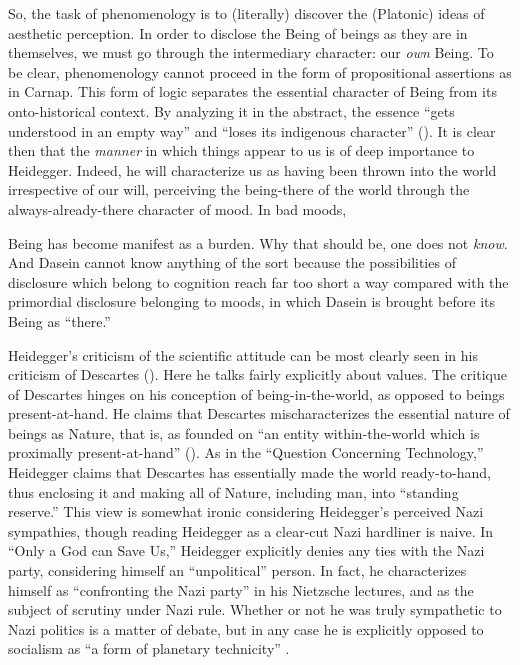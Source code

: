 \documentclass[leqno, 12pt]{turabian-researchpaper}
\begin{document}
	So, the task of phenomenology is to (literally) discover the (Platonic) ideas of
	aesthetic perception. In order to disclose the Being of beings as they are in
	themselves, we must go through the intermediary character: our \textit{own} Being.
	To be clear, phenomenology cannot proceed in the form of propositional assertions
	as in Carnap. This form of logic separates the essential character of Being
	from its onto-historical context. By analyzing it in the abstract, the essence
	\enquote{gets understood in an empty way} and \enquote{loses its indigenous character}
	(). It is clear then that the \textit{manner} in
	which things appear to us is of deep importance to Heidegger. Indeed, he will
	characterize us as having been thrown into the world irrespective of our will,
	perceiving the being-there of the world through the always-already-there character
	of mood. In bad moods,
	\begin{displayquote}
		 Being has become manifest as a burden.
		Why that should be, one does not \emph{know}. And Dasein cannot know anything
		of the sort because the possibilities of disclosure which belong to cognition
		reach far too short a way compared with the primordial disclosure belonging to
		moods, in which Dasein is brought before its Being as \enquote{there.}
	\end{displayquote}

	Heidegger's criticism of the scientific attitude can be most clearly seen in
	his criticism of Descartes (). Here
	he talks fairly explicitly about values. The critique of Descartes hinges on
	his conception of being-in-the-world, as opposed to beings present-at-hand. He
	claims that Descartes mischaracterizes the essential nature of beings as
	Nature, that is, as founded on \enquote{an entity within-the-world which is proximally present-at-hand}
	(). As in the \enquote{Question Concerning Technology,}
	\nocite{heidegger2008c} Heidegger claims that Descartes has essentially made
	the world ready-to-hand, thus enclosing it and making all of Nature, including
	man, into \enquote{standing reserve.} This view is somewhat ironic considering
	Heidegger's perceived Nazi sympathies, though reading Heidegger as a clear-cut
	Nazi hardliner is naive. In \enquote{Only a God can Save Us,} Heidegger explicitly
	denies any ties with the Nazi party, considering himself an \enquote{unpolitical}
	person. In fact, he characterizes himself as \enquote{confronting the Nazi party}
	in his Nietzsche lectures, and as the subject of scrutiny under Nazi rule.
	Whether or not he was truly sympathetic to Nazi politics is a matter of debate,
	but in any case he is explicitly opposed to socialism as \enquote{a form of planetary technicity}
	\autocite[206]{heidegger1981}.
\end{document}
